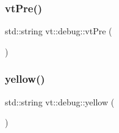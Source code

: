 \mbox{\label{namespacevt_1_1debug_acfaac527e91984bde40775eb9b4372ef}} 
\subsubsection{\texorpdfstring{vt\+Pre()}{vtPre()}}
{\footnotesize\ttfamily std\+::string vt\+::debug\+::vt\+Pre (\begin{DoxyParamCaption}{ }\end{DoxyParamCaption})\hspace{0.3cm}{\ttfamily [inline]}}

\mbox{\label{namespacevt_1_1debug_ad85c9e5ee0f986151a01212647d2b60d}} 
\subsubsection{\texorpdfstring{yellow()}{yellow()}}
{\footnotesize\ttfamily std\+::string vt\+::debug\+::yellow (\begin{DoxyParamCaption}{ }\end{DoxyParamCaption})\hspace{0.3cm}{\ttfamily [inline]}}

